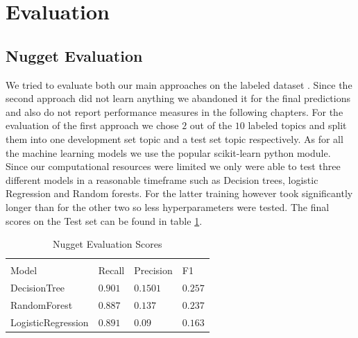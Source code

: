 \documentclass{article}
\begin{document}
\section{Evaluation}
\label{sec:eval}

\subsection{Nugget Evaluation}
We tried to evaluate both our main approaches on the labeled dataset \cite{Tauchmann.et.al.2018.LREC}. Since the second approach did not learn anything we abandoned it for the final predictions and also do not report performance measures in the following chapters. For the evaluation of the first approach we chose $2$ out of the $10$ labeled topics and split them into one development set topic and a test set topic respectively. As for all the machine learning models we use the popular scikit-learn python module. Since our computational resources were limited we only were able to test three different models in a reasonable timeframe such as Decision trees, logistic Regression and Random forests. For the latter training however took significantly longer than for the other two so less hyperparameters were tested.
The final scores on the Test set can be found in table \ref{Nugget_scores}.
\begin{table}
	\caption{Nugget Evaluation Scores}
	\label{Nugget_scores}
	\centering
	\begin{tabular}{llll}
		\toprule
		\multicolumn{4}{c}{}                   \\

		Model     & Recall & Precision & F1 \\
		\midrule
		DecisionTree & $0.901$  & $0.1501$ &   $0.257$   \\
		RandomForest     & $0.887$ & $0.137$ &   $0.237$   \\
		LogisticRegression     &  $0.891$ & $0.09$ & $0.163$  \\
		\bottomrule
	\end{tabular}
\end{table}
\end{document}
